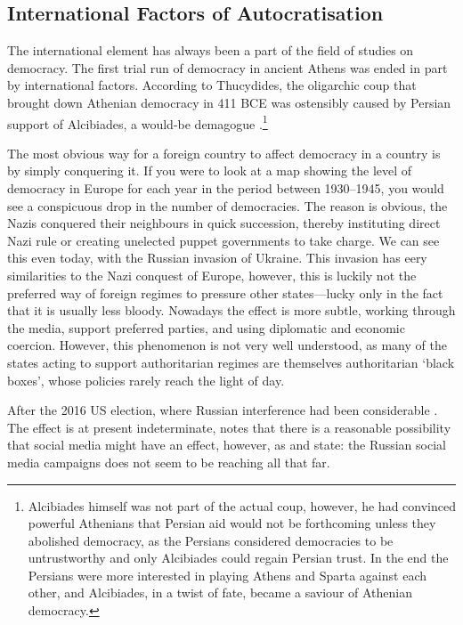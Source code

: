\subsection{International Factors of Autocratisation}
The international element has always been a part of the field of studies on democracy. The first trial run of democracy in ancient Athens was ended in part by international factors. According to Thucydides, the oligarchic coup that brought down Athenian democracy in 411 BCE was ostensibly caused by Persian support of Alcibiades, a would-be demagogue \citep[pp. 562-599]{thucydides_history_1972}.\footnote{Alcibiades himself was not part of the actual coup, however, he had convinced powerful Athenians that Persian aid would not be forthcoming unless they abolished democracy, as the Persians considered democracies to be untrustworthy and only Alcibiades could regain Persian trust. In the end the Persians were more interested in playing Athens and Sparta against each other, and Alcibiades, in a twist of fate, became a saviour of Athenian democracy.}

The most obvious way for a foreign country to affect democracy in a country is by simply conquering it. If you were to look at a map showing the level of democracy in Europe for each year in the period between 1930--1945, you would see a conspicuous drop in the number of democracies. The reason is obvious, the Nazis conquered their neighbours in quick succession, thereby instituting direct Nazi rule or creating unelected puppet governments to take charge. We can see this even today, with the Russian invasion of Ukraine. This invasion has eery similarities to the Nazi conquest of Europe, however, this is luckily not the preferred way of foreign regimes to pressure other states---lucky only in the fact that it is usually less bloody. Nowadays the effect is more subtle, working through the media, support preferred parties, and using diplomatic and economic coercion. However, this phenomenon is not very well understood, as many of the states acting to support authoritarian regimes are themselves authoritarian `black boxes', whose policies rarely reach the light of day.  

After the 2016 US election, where Russian interference had been considerable \citep[pp. 14-15]{mueller_report_2019}. The effect is at present indeterminate, \citet{zhuravskaya_political_2020} notes that there is a reasonable possibility that social media might have an effect, however, as \citet{eady_exposure_2023} and \citet{guess_reshares_2023} state: the Russian social media campaigns does not seem to be reaching all that far. 

